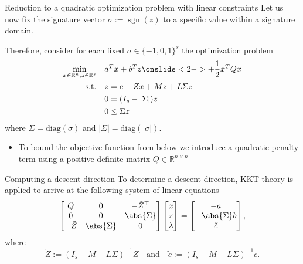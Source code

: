 \documentclass[aspectratio=169]{beamer}
\newcommand{\field}[1]{\mathbb{#1}}
\newcommand{\reals}{\field{R}}
\newcommand{\sgn}{\operatorname{sgn}}
\begin{document}
\begin{frame}{Reduction to a quadratic optimization problem with linear
        constraints}
    Let us now fix the signature vector \(\sigma := \sgn(z)\) to a specific
    value within a signature domain.

    Therefore, consider for each fixed \(\sigma \in \{-1, 0, 1\}^s\) the
    optimization problem
    \begin{align}
        \min_{x \in \reals^n, z \in \reals^s} \quad & a^T x + b^T z
        \onslide<2->{+ \frac{1}{2}x^TQx}                                          \\
        \text{s.t.} \quad                           & z = c + Zx + Mz + L\Sigma z \\
                                                    & 0 = (I_s - |\Sigma|)z       \\
                                                    & 0 \leq \Sigma z
    \end{align}
    where \(\Sigma = \text{diag}(\sigma)\) and \(|\Sigma| = \text{diag}(|\sigma|)\).

    \begin{itemize}[<+(1)->]
        \item To bound the objective function from below we introduce a
              quadratic penalty term using a positive definite matrix \(Q \in
              \reals^{n \times n}\)
    \end{itemize}
\end{frame}

\begin{frame}{Computing a descent direction}
    To determine a descent direction, KKT-theory is applied to arrive at the
    following system of linear equations
    \[
        \begin{bmatrix}
            Q          & 0            & -\tilde{Z}^{\top} \\
            0          & 0            & \abs{\Sigma}      \\
            -\tilde{Z} & \abs{\Sigma} & 0
        \end{bmatrix}
        \begin{bmatrix}
            x \\
            z \\
            \lambda
        \end{bmatrix}
        =
        \begin{bmatrix}
            -a              \\
            -\abs{\Sigma} b \\
            \tilde{c}
        \end{bmatrix},
    \]
    where
    \[
        \tilde{Z} := (I_s - M - L\Sigma)^{-1} Z \quad \text{and} \quad
        \tilde{c} := (I_s - M - L\Sigma)^{-1} c.
    \]
\end{frame}
\end{document}
